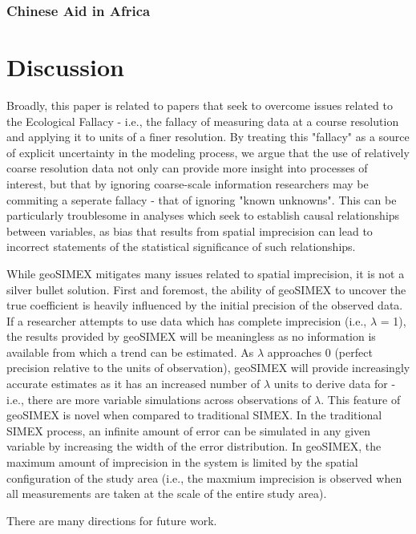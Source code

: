 \subsubsection{Chinese Aid in Africa}

\newpage

\section{Discussion}
Broadly, this paper is related to papers that seek to overcome issues related to the Ecological Fallacy - i.e., the fallacy of measuring data at a course resolution and applying it to units of a finer resolution.
By treating this "fallacy" as a source of explicit uncertainty in the modeling process, we argue that the use of relatively coarse resolution data not only can provide more insight into processes of interest, but that by ignoring coarse-scale information researchers may be commiting a seperate fallacy - that of ignoring "known unknowns".
This can be particularly troublesome in analyses which seek to establish causal relationships between variables, as bias that results from spatial imprecision can lead to incorrect statements of the statistical significance of such relationships.
\par
While geoSIMEX mitigates many issues related to spatial imprecision, it is not a silver bullet solution.
First and foremost, the ability of geoSIMEX to uncover the true coefficient is heavily influenced by the initial precision of the observed data.
If a researcher attempts to use data which has complete imprecision (i.e., $\lambda$ = 1), the results provided by geoSIMEX will be meaningless as no information is available from which a trend can be estimated.
As $\lambda$ approaches 0 (perfect precision relative to the units of observation), geoSIMEX will provide increasingly accurate estimates as it has an increased number of $\lambda$ units to derive data for - i.e., there are more variable simulations across observations of $\lambda$.
This feature of geoSIMEX is novel when compared to traditional SIMEX.
In the traditional SIMEX process, an infinite amount of error can be simulated in any given variable by increasing the width of the error distribution.
In geoSIMEX, the maximum amount of imprecision in the system is limited by the spatial configuration of the study area (i.e., the maxmium imprecision is observed when all measurements are taken at the scale of the entire study area).
\par
There are many directions for future work.
